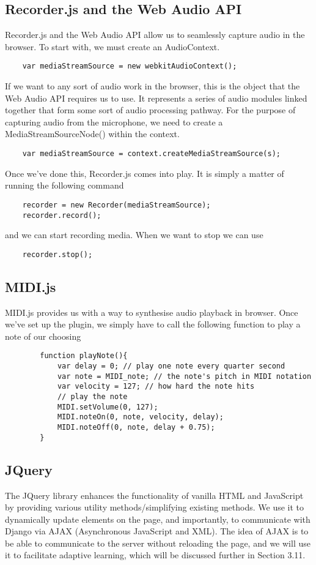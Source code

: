 	\subsection{Recorder.js and the Web Audio API}
	Recorder.js and the Web Audio API allow us to seamlessly capture audio in the browser. To start with, we must create an AudioContext.
	\begin{lstlisting}
	var mediaStreamSource = new webkitAudioContext();
	\end{lstlisting}
	If we want to any sort of audio work in the browser, this is the object that the Web Audio API requires us to use. It represents a series of audio modules linked together that form some sort of audio processing pathway.
	 For the purpose of capturing audio from the microphone, we need to create a MediaStreamSourceNode() within the context.
	\begin{lstlisting}
	var mediaStreamSource = context.createMediaStreamSource(s);
	\end{lstlisting}
	Once we've done this, Recorder.js comes into play. It is simply a matter of running  the following command
	\begin{lstlisting}	
	recorder = new Recorder(mediaStreamSource);
    recorder.record();
	\end{lstlisting}
	and we can start recording media. When we want to stop we can use 
	\begin{lstlisting}	
	recorder.stop();
	\end{lstlisting}
	
	\subsection{MIDI.js}
	 MIDI.js provides us with a way to synthesise audio playback in browser. Once we've set up the plugin, we simply have to call the following function to play a note of our choosing
	 \begin{lstlisting}	 
		function playNote(){
		    var delay = 0; // play one note every quarter second
		    var note = MIDI_note; // the note's pitch in MIDI notation
		    var velocity = 127; // how hard the note hits
		    // play the note
		    MIDI.setVolume(0, 127);
		    MIDI.noteOn(0, note, velocity, delay);
		    MIDI.noteOff(0, note, delay + 0.75);
		}
	\end{lstlisting}
	
	\subsection{JQuery}
	The JQuery library enhances the functionality of vanilla HTML and JavaScript by providing various utility methods/simplifying existing methods. We use it to dynamically update elements on the page, and importantly, to communicate with Django via AJAX (Asynchronous JavaScript and XML). The idea of AJAX is to be able to communicate to the server without reloading the page, and we will use it to facilitate adaptive learning, which will be discussed further in Section 3.11.
	

